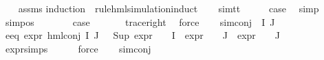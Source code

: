 \begin{isabellebody}
%
\isadelimproof
\ \ %
\endisadelimproof
%
\isatagproof
{}\isamarkupfalse%
\ assms\isanewline
{}\isamarkupfalse%
{\isacharparenleft}{\kern0pt}induction\ {\isasymphi}\ rule{\isacharcolon}{\kern0pt}hml{\isacharunderscore}{\kern0pt}simulation{\isachardot}{\kern0pt}induct{\isacharparenright}{\kern0pt}\isanewline
\ \ \isamarkupfalse%
\ sim{\isacharunderscore}{\kern0pt}tt\isanewline
\ \ \isamarkupfalse%
\ \isamarkupfalse%
\ {\isacharquery}{\kern0pt}case\ \isamarkupfalse%
\ simp\ \isanewline
{}\isamarkupfalse%
\isanewline
\ \ \isamarkupfalse%
\ {\isacharparenleft}{\kern0pt}sim{\isacharunderscore}{\kern0pt}pos\ {\isasymphi}\ {\isasymalpha}{\isacharparenright}{\kern0pt}\isanewline
\ \ \isamarkupfalse%
\ \isamarkupfalse%
\ {\isacharquery}{\kern0pt}case\ \isanewline
\ \ \ \ \isamarkupfalse%
\ trace{\isacharunderscore}{\kern0pt}right\ \isamarkupfalse%
\ force\isanewline
{}\isamarkupfalse%
\isanewline
\ \ \isamarkupfalse%
\ {\isacharparenleft}{\kern0pt}sim{\isacharunderscore}{\kern0pt}conj\ {\isasymPhi}\ I\ J{\isacharparenright}{\kern0pt}\isanewline
\ \ \isamarkupfalse%
\ e{}{\isacharunderscore}{\kern0pt}eq{\isacharcolon}{\kern0pt}\ {\isachardoublequoteopen}expr{\isacharunderscore}{\kern0pt}{}\ {\isacharparenleft}{\kern0pt}hml{\isacharunderscore}{\kern0pt}conj\ I\ J\ {\isasymPhi}{\isacharparenright}{\kern0pt}\ {\isacharequal}{\kern0pt}\ {\isacharparenleft}{\kern0pt}Sup\ {\isacharparenleft}{\kern0pt}{\isacharparenleft}{\kern0pt}expr{\isacharunderscore}{\kern0pt}{}\ {\isasymcirc}\ {\isasymPhi}{\isacharparenright}{\kern0pt}\ {\isacharbackquote}{\kern0pt}\ I\ {\isasymunion}\ {\isacharparenleft}{\kern0pt}expr{\isacharunderscore}{\kern0pt}{}\ {\isasymcirc}\ {\isasymPhi}{\isacharparenright}{\kern0pt}\ {\isacharbackquote}{\kern0pt}\ J\ {\isasymunion}\ {\isacharparenleft}{\kern0pt}expr{\isacharunderscore}{\kern0pt}{}\ {\isasymcirc}\ {\isasymPhi}{\isacharparenright}{\kern0pt}\ {\isacharbackquote}{\kern0pt}\ J{\isacharparenright}{\kern0pt}{\isacharparenright}{\kern0pt}{\isachardoublequoteclose}\isanewline
\ \ \ \ \isamarkupfalse%
\ expr{\isacharunderscore}{\kern0pt}{}{\isachardot}{\kern0pt}simps\isanewline
\ \ \ \ \isamarkupfalse%
\ force\isanewline
\ \ \isamarkupfalse%
\ sim{\isacharunderscore}{\kern0pt}conj\ \isamarkupfalse%

\end{isabellebody}
